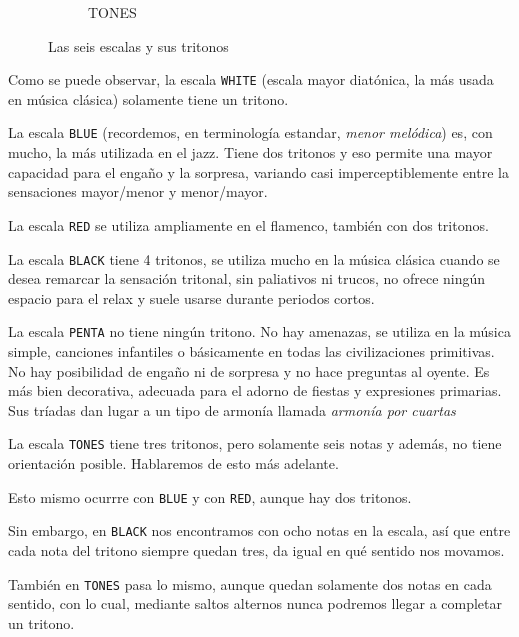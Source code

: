 \documentclass[]{article}
\begin{document}
\begin{figure}[h]
\begin{subfigure}{0.15\textwidth}
    \caption{\textsf{TONES}}
    
  \end{subfigure}
  \hfill
  \caption{Las seis escalas y sus tritonos}\label{fig:the-six-scales-and-tritones}
\end{figure}


Como se puede observar, la escala \texttt{WHITE} (escala mayor diatónica, la más usada en música clásica) solamente tiene un tritono.

La escala \texttt{BLUE} (recordemos, en terminología estandar, \emph{menor melódica}) es, con mucho, la más utilizada en el jazz. Tiene dos tritonos y eso permite una mayor capacidad para el engaño y la sorpresa, variando casi imperceptiblemente entre la sensaciones mayor/menor y menor/mayor.

La escala \texttt{RED} se utiliza ampliamente en el flamenco, también con dos tritonos.

La escala \texttt{BLACK} tiene 4 tritonos, se utiliza mucho en la música clásica cuando se desea remarcar la sensación tritonal, sin paliativos ni trucos, no ofrece ningún espacio para el relax y suele usarse durante periodos cortos.

La escala \texttt{PENTA} no tiene ningún tritono. No hay amenazas, se utiliza en la música simple, canciones infantiles o básicamente en todas las civilizaciones primitivas. No hay posibilidad de engaño ni de sorpresa y no hace preguntas al oyente. Es más bien decorativa, adecuada para el adorno de fiestas y expresiones primarias. Sus tríadas dan lugar a un tipo de armonía llamada \emph{armonía por cuartas }

La escala \texttt{TONES} tiene tres tritonos, pero solamente seis notas y además, no tiene orientación posible. Hablaremos de esto más adelante.

Esto mismo ocurrre con \texttt{BLUE} y con \texttt{RED}, aunque hay dos tritonos.

Sin embargo, en \texttt{BLACK} nos encontramos con ocho notas en la escala, así que entre cada nota del tritono siempre quedan tres, da igual en qué sentido nos movamos.

También en \texttt{TONES} pasa lo mismo, aunque quedan solamente dos notas en cada sentido, con lo cual, mediante saltos alternos nunca podremos llegar a completar un tritono.
\end{document}
